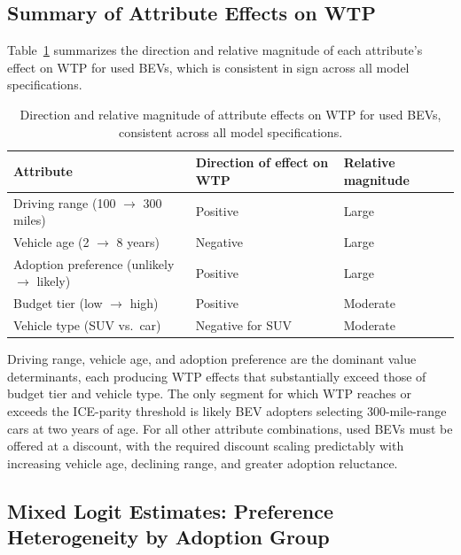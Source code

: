 \documentclass[a4paper,fleqn]{cas-sc}   %
\begin{document}
\subsection{Summary of Attribute Effects on WTP}
\label{subsec:summary}

Table~\ref{table:wtp_summary} summarizes the direction and relative magnitude of each attribute's effect on WTP for used BEVs, which is consistent in sign across all model specifications.

\begin{table}[pos=H]
\caption{Direction and relative magnitude of attribute effects on WTP for used BEVs, consistent across all model specifications.}
\label{table:wtp_summary}
\centering
{\renewcommand{\arraystretch}{1.3}
\begin{tabular}{lll}
\toprule
\textbf{Attribute} & \textbf{Direction of effect on WTP} & \textbf{Relative magnitude} \\
\midrule
Driving range (100 $\to$ 300 miles)          & Positive         & Large    \\
Vehicle age (2 $\to$ 8 years)                & Negative         & Large    \\
Adoption preference (unlikely $\to$ likely)  & Positive         & Large    \\
Budget tier (low $\to$ high)                 & Positive         & Moderate \\
Vehicle type (SUV vs.\ car)                  & Negative for SUV & Moderate \\
\bottomrule
\end{tabular}}
\end{table}

Driving range, vehicle age, and adoption preference are the dominant value determinants, each producing WTP effects that substantially exceed those of budget tier and vehicle type. The only segment for which WTP reaches or exceeds the ICE-parity threshold is likely BEV adopters selecting 300-mile-range cars at two years of age. For all other attribute combinations, used BEVs must be offered at a discount, with the required discount scaling predictably with increasing vehicle age, declining range, and greater adoption reluctance.

\subsection{Mixed Logit Estimates: Preference Heterogeneity by Adoption Group}
\label{subsec:mxl_results}
\end{document}
